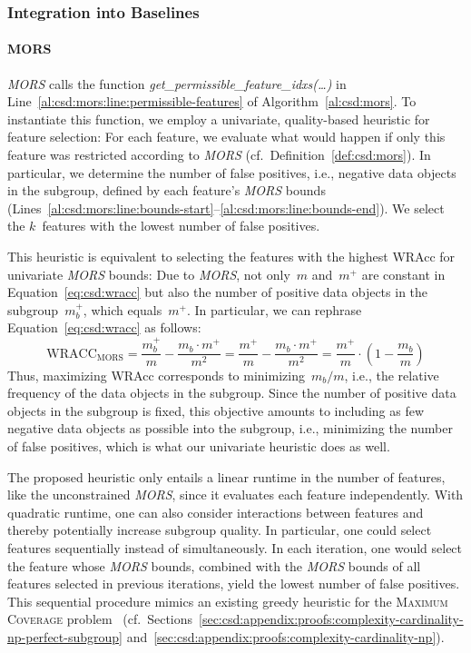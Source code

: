 \documentclass{article}
\theoremstyle{definition}
\begin{document}
\subsubsection{Integration into Baselines}
\label{sec:csd:approach:cardinality:baselines}

\paragraph{MORS}

\emph{MORS} calls the function \emph{get\_permissible\_feature\_idxs(\dots)} in Line~\ref{al:csd:mors:line:permissible-features} of Algorithm~\ref{al:csd:mors}.
To instantiate this function, we employ a univariate, quality-based heuristic for feature selection:
For each feature, we evaluate what would happen if only this feature was restricted according to \emph{MORS} (cf.~Definition~\ref{def:csd:mors}).
In particular, we determine the number of false positives, i.e., negative data objects in the subgroup, defined by each feature's \emph{MORS} bounds (Lines~\ref{al:csd:mors:line:bounds-start}--\ref{al:csd:mors:line:bounds-end}).
We select the $k$~features with the lowest number of false positives.

This heuristic is equivalent to selecting the features with the highest WRAcc for univariate \emph{MORS} bounds:
Due to \emph{MORS}, not only~$m$ and~$m^+$ are constant in Equation~\ref{eq:csd:wracc} but also the number of positive data objects in the subgroup~$m_b^+$, which equals~$m^+$.
In particular, we can rephrase Equation~\ref{eq:csd:wracc} as follows:
%
\begin{equation}
	\text{WRACC}_{\text{MORS}} = \frac{m_b^+}{m} - \frac{m_b \cdot m^+}{m^2} = \frac{m^+}{m} - \frac{m_b \cdot m^+}{m^2} = \frac{m^+}{m} \cdot \left( 1 - \frac{m_b}{m} \right)
	\label{eq:csd:wracc-mors}
\end{equation}
%
Thus, maximizing WRAcc corresponds to minimizing~$m_b / m$, i.e., the relative frequency of the data objects in the subgroup.
Since the number of positive data objects in the subgroup is fixed, this objective amounts to including as few negative data objects as possible into the subgroup, i.e., minimizing the number of false positives, which is what our univariate heuristic does as well.

The proposed heuristic only entails a linear runtime in the number of features, like the unconstrained \emph{MORS}, since it evaluates each feature independently.
With quadratic runtime, one can also consider interactions between features and thereby potentially increase subgroup quality.
In particular, one could select features sequentially instead of simultaneously.
In each iteration, one would select the feature whose \emph{MORS} bounds, combined with the \emph{MORS} bounds of all features selected in previous iterations, yield the lowest number of false positives.
This sequential procedure mimics an existing greedy heuristic for the \textsc{Maximum Coverage} problem~\cite{chekuri2004maximum} (cf.~Sections~\ref{sec:csd:appendix:proofs:complexity-cardinality-np-perfect-subgroup} and~\ref{sec:csd:appendix:proofs:complexity-cardinality-np}).
\end{document}
